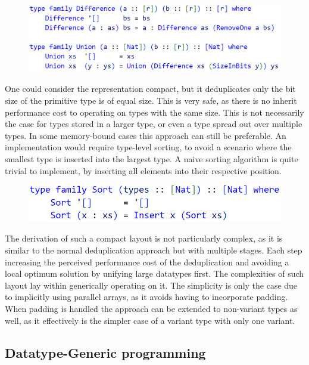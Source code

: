 \documentclass{article}
\begin{document}
\begin{figure}[hbt!]
    \hspace{1em}
    \includegraphics[scale=0.42]{CodeType12.png}
\end{figure}

One could consider the representation compact, but it deduplicates only the bit size of the primitive type is of equal size.
This is very safe, as there is no inherit performance cost to operating on types with the same size.
This is not necessarily the case for types stored in a larger type, or even a type spread out over multiple types.
In some memory-bound cases this approach can still be preferable.
An implementation would require type-level sorting, to avoid a scenario where the smallest type is inserted into the largest type.
A naive sorting algorithm is quite trivial to implement, by inserting all elements into their respective position. 

\begin{figure}[hbt!]
    \hspace{1em}
    \includegraphics[scale=0.42]{CodeType13.png}
\end{figure}

The derivation of such a compact layout is not particularly complex, as it is similar to the normal deduplication approach but with multiple stages.
Each step increasing the perceived performance cost of the deduplication and avoiding a local optimum solution by unifying large datatypes first. 
The complexities of such layout lay within generically operating on it.
The simplicity is only the case due to implicitly using parallel arrays, as it avoids having to incorporate padding.
When padding is handled the approach can be extended to non-variant types as well, as it effectively is the simpler case of a variant type with only one variant.

\newpage

\subsection{Datatype-Generic programming}
\end{document}
